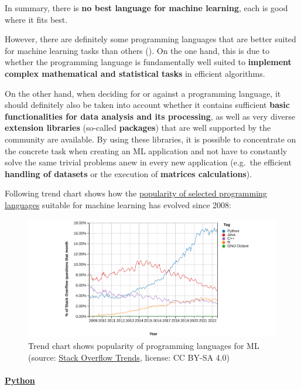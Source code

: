 \documentclass [oneside,10pt,a4paper,ngerman,BCOR10mm,headsepline,parindent,final]{scrartcl}
\begin{document}
In summary, there is \textbf{no best language for machine learning},
each is good where it fits best.

However, there are definitely some programming languages that are better
suited for machine learning tasks than others
(\cite{ML_bestLanguage_2021}). On the one hand, this is due to whether
the programming language is fundamentally well suited to
\textbf{implement complex mathematical and statistical tasks} in
efficient algorithms.

On the other hand, when deciding for or against a programming language,
it should definitely also be taken into account whether it contains
sufficient \textbf{basic functionalities for data analysis and its
processing}, as well as very diverse \textbf{extension libraries}
(so-called \textbf{packages}) that are well supported by the community
are available. By using these libraries, it is possible to concentrate
on the concrete task when creating an ML application and not have to
constantly solve the same trivial problems anew in every new application
(e.g.~the efficient \textbf{handling of datasets} or the execution of
\textbf{matrices calculations}).

Following trend chart shows how the
\href{https://insights.stackoverflow.com/trends?tags=python\%2Cr\%2Coctave\%2Cjava\%2Cc\%2B\%2B}{popularity
of selected programming languages} suitable for machine learning has
evolved since 2008:

\begin{figure}
\centering
\includegraphics{images/2022-09-07_StackOverflowTrends_ProgrammingLanguages_wide.png}
\caption{Trend chart shows popularity of programming languages for ML
(source:
\href{https://insights.stackoverflow.com/trends?tags=python\%2Cr\%2Coctave\%2Cjava\%2Cc\%2B\%2B}{Stack
Overflow Trends}, license: CC BY-SA 4.0)}
\end{figure}

    \hypertarget{python}{%
\paragraph{\texorpdfstring{\href{https://en.wikipedia.org/wiki/Python_(programming_language)}{Python}}{Python}}\label{python}}
\end{document}
